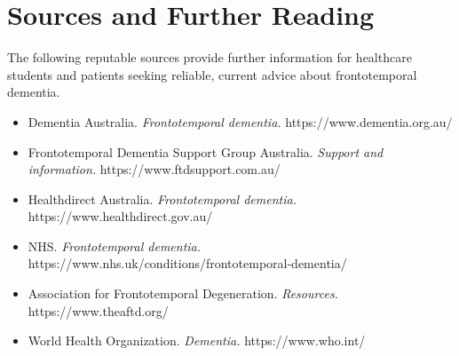 \section*{Sources and Further Reading}
The following reputable sources provide further information for healthcare students and patients seeking reliable, current advice about frontotemporal dementia.
\begin{itemize}
    \item Dementia Australia. \textit{Frontotemporal dementia.} https://www.dementia.org.au/
    \item Frontotemporal Dementia Support Group Australia. \textit{Support and information.} https://www.ftdsupport.com.au/
    \item Healthdirect Australia. \textit{Frontotemporal dementia.} https://www.healthdirect.gov.au/
    \item NHS. \textit{Frontotemporal dementia.} https://www.nhs.uk/conditions/frontotemporal-dementia/
    \item Association for Frontotemporal Degeneration. \textit{Resources.} https://www.theaftd.org/
    \item World Health Organization. \textit{Dementia.} https://www.who.int/
\end{itemize}
